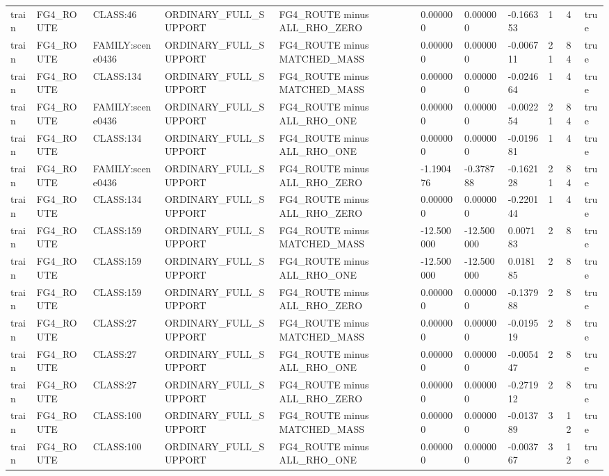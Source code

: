 \begin{tabular}{lllllllllll}
train & FG4\_ROUTE & CLASS:46 & ORDINARY\_FULL\_SUPPORT & FG4\_ROUTE minus ALL\_RHO\_ZERO & 0.000000 & 0.000000 & -0.166353 & 1 & 4 & true \\
train & FG4\_ROUTE & FAMILY:scene0436 & ORDINARY\_FULL\_SUPPORT & FG4\_ROUTE minus MATCHED\_MASS & 0.000000 & 0.000000 & -0.006711 & 21 & 84 & true \\
train & FG4\_ROUTE & CLASS:134 & ORDINARY\_FULL\_SUPPORT & FG4\_ROUTE minus MATCHED\_MASS & 0.000000 & 0.000000 & -0.024664 & 1 & 4 & true \\
train & FG4\_ROUTE & FAMILY:scene0436 & ORDINARY\_FULL\_SUPPORT & FG4\_ROUTE minus ALL\_RHO\_ONE & 0.000000 & 0.000000 & -0.002254 & 21 & 84 & true \\
train & FG4\_ROUTE & CLASS:134 & ORDINARY\_FULL\_SUPPORT & FG4\_ROUTE minus ALL\_RHO\_ONE & 0.000000 & 0.000000 & -0.019681 & 1 & 4 & true \\
train & FG4\_ROUTE & FAMILY:scene0436 & ORDINARY\_FULL\_SUPPORT & FG4\_ROUTE minus ALL\_RHO\_ZERO & -1.190476 & -0.378788 & -0.162128 & 21 & 84 & true \\
train & FG4\_ROUTE & CLASS:134 & ORDINARY\_FULL\_SUPPORT & FG4\_ROUTE minus ALL\_RHO\_ZERO & 0.000000 & 0.000000 & -0.220144 & 1 & 4 & true \\
train & FG4\_ROUTE & CLASS:159 & ORDINARY\_FULL\_SUPPORT & FG4\_ROUTE minus MATCHED\_MASS & -12.500000 & -12.500000 & 0.007183 & 2 & 8 & true \\
train & FG4\_ROUTE & CLASS:159 & ORDINARY\_FULL\_SUPPORT & FG4\_ROUTE minus ALL\_RHO\_ONE & -12.500000 & -12.500000 & 0.018185 & 2 & 8 & true \\
train & FG4\_ROUTE & CLASS:159 & ORDINARY\_FULL\_SUPPORT & FG4\_ROUTE minus ALL\_RHO\_ZERO & 0.000000 & 0.000000 & -0.137988 & 2 & 8 & true \\
train & FG4\_ROUTE & CLASS:27 & ORDINARY\_FULL\_SUPPORT & FG4\_ROUTE minus MATCHED\_MASS & 0.000000 & 0.000000 & -0.019519 & 2 & 8 & true \\
train & FG4\_ROUTE & CLASS:27 & ORDINARY\_FULL\_SUPPORT & FG4\_ROUTE minus ALL\_RHO\_ONE & 0.000000 & 0.000000 & -0.005447 & 2 & 8 & true \\
train & FG4\_ROUTE & CLASS:27 & ORDINARY\_FULL\_SUPPORT & FG4\_ROUTE minus ALL\_RHO\_ZERO & 0.000000 & 0.000000 & -0.271912 & 2 & 8 & true \\
train & FG4\_ROUTE & CLASS:100 & ORDINARY\_FULL\_SUPPORT & FG4\_ROUTE minus MATCHED\_MASS & 0.000000 & 0.000000 & -0.013789 & 3 & 12 & true \\
train & FG4\_ROUTE & CLASS:100 & ORDINARY\_FULL\_SUPPORT & FG4\_ROUTE minus ALL\_RHO\_ONE & 0.000000 & 0.000000 & -0.003767 & 3 & 12 & true \\

\end{tabular}
